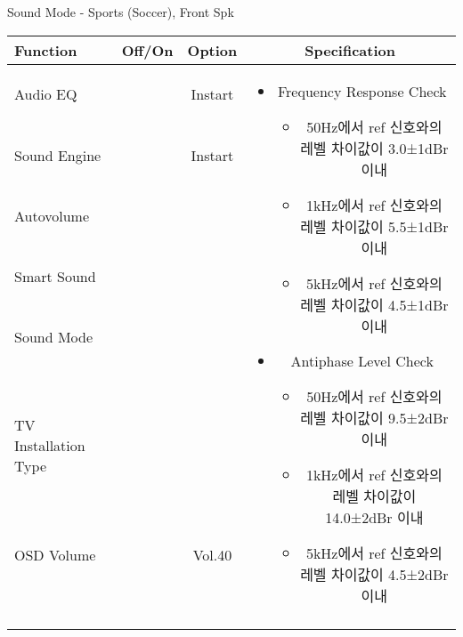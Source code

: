 \begin{frame}[t]{Sound Mode - Sports (Soccer), Front Spk}
\begin{tiny}
\begin{tabular}{@{}lccc@{}}
\toprule
Function & Off/On & Option & Specification \\
\midrule
Audio EQ & \color{black}{Off} & Instart &
\multirow{10}{60mm}{
\begin{itemize}
\item Frequency Response Check
	\begin{itemize}
	\item 50Hz에서 ref 신호와의 레벨 차이값이 3.0±1dBr 이내
	\item 1kHz에서 ref 신호와의 레벨 차이값이 5.5±1dBr 이내
	\item 5kHz에서 ref 신호와의 레벨 차이값이 4.5±1dBr 이내
	\end{itemize}
\item Antiphase Level Check
	\begin{itemize}
	\item 50Hz에서 ref 신호와의 레벨 차이값이 9.5±2dBr 이내
	\item 1kHz에서 ref 신호와의 레벨 차이값이 14.0±2dBr 이내
	\item 5kHz에서 ref 신호와의 레벨 차이값이 4.5±2dBr 이내
	\end{itemize}
\end{itemize}
} \\
Sound Engine & \color{blue}{On} & Instart & \\
Autovolume & \color{black}{Off} & & \\
Smart Sound & \color{black}{Off} & & \\
Sound Mode & \color{blue}{On} & \color{blue}{Sports} & \\
TV Installation Type & \color{blue}{On} & \color{black}{Standtype1} & \\
OSD Volume & \color{blue}{On} & Vol.40 & \\
& & & \\
& & & \\
& & & \\
& & & \\
\midrule
\end{tabular}
\end{tiny}


\end{frame}



